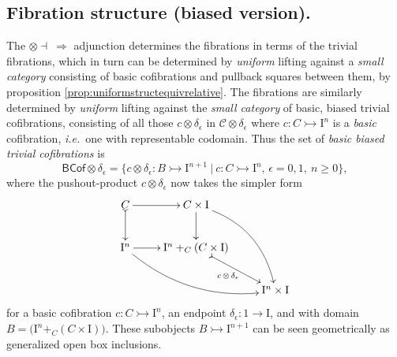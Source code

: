 \documentclass[11pt,reqno]{amsart}
\newcommand{\ie}{\emph{i.e.}}
\newcommand{\mono}{\ensuremath{\rightarrowtail}}
\newcommand{\ra}{\ensuremath{\rightarrow}}
\newcommand{\I}{\ensuremath{\mathrm{I}}}
\theoremstyle{remark}
\theoremstyle{definition}
\begin{document}
\subsection*{Fibration structure (biased version).}
The $\otimes\dashv\ \Rightarrow$ adjunction determines the fibrations in terms of the trivial fibrations, which in turn can be determined by \emph{uniform} lifting against a \emph{small category} consisting of basic cofibrations and pullback squares between them, by proposition \ref{prop:uniformstructequivrelative}.  The fibrations are similarly determined by \emph{uniform} lifting against the \emph{small category} of basic, biased trivial cofibrations, consisting of all those $c \otimes \delta_\epsilon$ in $\mathcal{C}\otimes \delta_\epsilon$ where $c : C \mono \I^n$ is a \emph{basic} cofibration, \ie\ one with representable codomain.  
Thus the set of \emph{basic biased trivial cofibrations} is
\begin{equation}\label{eq:basicTCof}
\mathsf{BCof}\otimes \delta_\epsilon = \{c \otimes \delta_\epsilon : B \mono \I^{n+1}\ |\ c : C\mono \I^n,\,\epsilon = 0,1,\ n\geq 0 \},
\end{equation}
where the pushout-product $c\otimes\delta_\epsilon$ now takes the simpler form
\begin{equation}\label{diagram:basicpushoutproduct}
\xymatrix{
C \ar@{>->}[d] \ar[r] & C\times \I \ar[d] \ar@/^4ex/ [rdd]\\
\I^{n} \ar@/_4ex/ [rrd] \ar[r] &  \I^n +_C (C\times\I) \ar@{>->}[rd]_{c\, \otimes\, \delta_\epsilon} \\
&& \I^{n}\times\I
}
\end{equation}
for a basic cofibration $c : C\mono \I^n$, an endpoint $\delta_\epsilon:1 \ra \I$, and with domain $B = \big(\I^n +_C (C\times\I)\big)$.   These subobjects $B \mono \I^{n+1}$ can be seen geometrically as generalized open box inclusions.
\end{document}
